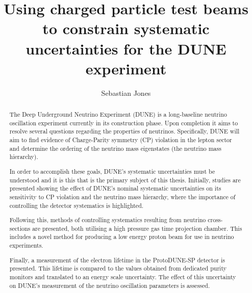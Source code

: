 
\title{Using charged particle test beams to constrain systematic uncertainties for the DUNE experiment}
\author{Sebastian Jones}

\maketitle
\makedeclaration

\begin{abstract} %

The Deep Underground Neutrino Experiment (DUNE) is a long-baseline neutrino oscillation experiment currently in its construction phase.
Upon completion it aims to resolve several questions regarding the properties of neutrinos.
Specifically, DUNE will aim to find evidence of Charge-Parity symmetry (CP) violation in the lepton sector and determine the ordering of the neutrino mass eigenstates (the neutrino mass hierarchy).

In order to accomplish these goals, DUNE's systematic uncertainties must be understood and it is this that is the primary subject of this thesis.
Initially, studies are presented showing the effect of DUNE's nominal systematic uncertainties on its sensitivity to CP violation and the neutrino mass hierarchy, where the importance of controlling the detector systematics is highlighted. 

Following this, methods of controlling systematics resulting from neutrino cross-sections are presented, both utilising a high pressure gas time projection chamber.
This includes a novel method for producing a low energy proton beam for use in neutrino experiments.

Finally, a measurement of the electron lifetime in the ProtoDUNE-SP detector is presented.
This lifetime is compared to the values obtained from dedicated purity monitors and translated to an energy scale uncertainty.
The effect of this uncertainty on DUNE's measurement of the neutrino oscillation parameters is assessed.



\end{abstract}

